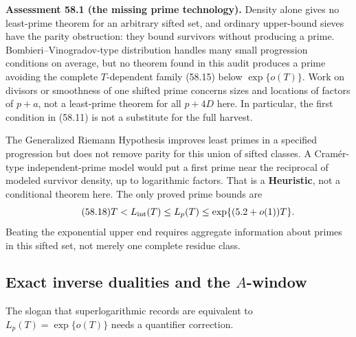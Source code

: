 \documentclass[10pt,reqno]{amsart}
\theoremstyle{definition}
\newcommand{\1}{\mathbf 1}
\begin{document}
\medskip\noindent\textbf{Assessment 58.1 (the missing prime technology).}
Density alone gives no least-prime theorem for an arbitrary sifted set, and
ordinary upper-bound sieves have the parity obstruction: they bound
survivors without producing a prime.  Bombieri--Vinogradov-type distribution
handles many small progression conditions on average, but no theorem found
in this audit produces a prime avoiding the complete $T$-dependent family
(58.15) below $\exp\{o(T)\}$.  Work on divisors or smoothness of one shifted
prime concerns sizes and locations of factors of $p+a$, not a least-prime
theorem for all $p+4D$ here.  In particular, the first condition in (58.11)
is not a substitute for the full harvest.

The Generalized Riemann Hypothesis improves least primes in a specified
progression but does not remove parity for this union of sifted classes.  A
Cram\'er-type independent-prime model would put a first prime near the
reciprocal of modeled survivor density, up to logarithmic factors.  That is
a \textbf{Heuristic}, not a conditional theorem here.  The only proved prime
bounds are
\begin{equation}\tag{58.18}
 T<L_{\rm int}(T)\leq L_p(T)
          \leq\exp\{(5.2+o(1))T\}.
\end{equation}
Beating the exponential upper end requires aggregate information about
primes in this sifted set, not merely one complete residue class.

\subsection{Exact inverse dualities and the $A$-window}
The slogan that superlogarithmic records are equivalent to
$L_p(T)=\exp\{o(T)\}$ needs a quantifier correction.
\end{document}
